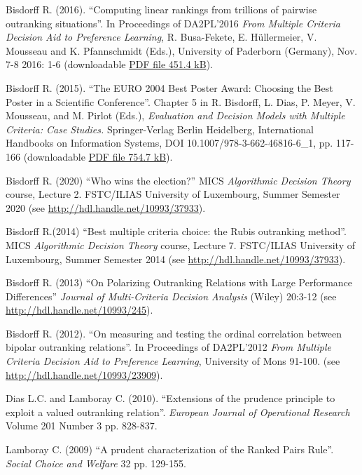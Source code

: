 \begin{thebibliography}{99.}
 Bisdorff R. (2016). ``Computing linear rankings from trillions of pairwise outranking situations''. In Proceedings of DA2PL'2016 \emph{From Multiple Criteria Decision Aid to Preference Learning}, R. Busa-Fekete, E. Hüllermeier, V. Mousseau and K. Pfannschmidt (Eds.), University of Paderborn (Germany), Nov. 7-8 2016: 1-6 (downloadable \href{http://hdl.handle.net/10993/28613}{PDF file 451.4 kB}).
	      
 Bisdorff R. (2015). ``The EURO 2004 Best Poster Award: Choosing the Best Poster in a Scientific Conference''. Chapter 5 in R. Bisdorff, L. Dias, P. Meyer, V. Mousseau, and M. Pirlot (Eds.), \emph{Evaluation and Decision Models with Multiple Criteria: Case Studies.} Springer-Verlag Berlin Heidelberg, International Handbooks on Information Systems, DOI 10.1007/978-3-662-46816-6\_1, pp. 117-166 (downloadable \href{http://hdl.handle.net/10993/23714}{PDF file 754.7 kB}).
	      
 Bisdorff R. (2020)  ``Who wins the election?'' MICS \emph{Algorithmic Decision Theory} course, Lecture 2. FSTC/ILIAS University of Luxembourg, Summer Semester 2020 (see \url{http://hdl.handle.net/10993/37933}).

 Bisdorff R.(2014)  ``Best multiple criteria choice: the Rubis outranking method''. MICS \emph{Algorithmic Decision Theory} course, Lecture 7. FSTC/ILIAS University of Luxembourg, Summer Semester 2014 (see \url{http://hdl.handle.net/10993/37933}).

 Bisdorff R. (2013) ``On Polarizing Outranking Relations with Large Performance Differences'' \emph{Journal of Multi-Criteria Decision Analysis} (Wiley) 20:3-12 (see \url{http://hdl.handle.net/10993/245}).

 Bisdorff R. (2012). ``On measuring and testing the ordinal correlation between bipolar outranking relations''. In Proceedings of DA2PL’2012 \emph{From Multiple Criteria Decision Aid to Preference Learning}, University of Mons 91-100. (see \url{http://hdl.handle.net/10993/23909}).

 Dias L.C. and Lamboray C. (2010). ``Extensions of the prudence principle to exploit a valued outranking relation''. \emph{European Journal of Operational Research} Volume 201 Number 3 pp. 828-837.

 Lamboray C. (2009) ``A prudent characterization of the Ranked Pairs Rule''. \emph{Social Choice and Welfare} 32 pp. 129-155.


\end{thebibliography}

